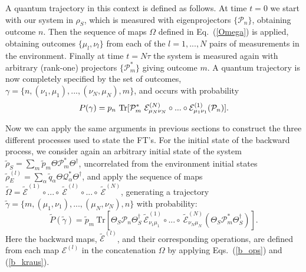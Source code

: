 \documentclass[aps,prx,twocolumn,showpacs,floatfix,superscriptaddress,graphics,longbibliography]{revtex4-1}
\newcommand{\tr}{\mathrm{Tr}}
\newcommand{\E}{{\mathcal E}}
\newcommand{\HAT}{}
\begin{document}
A quantum trajectory in this context is defined as follows. At time $t=0$ we start with our system in $\rho_S$, which is measured with eigenprojectors $\{ \HAT{\mathcal{P}}_n\}$, 
obtaining outcome $n$. Then the sequence of maps $\HAT{\Omega}$ defined in Eq.~(\ref{Omega}) is applied, obtaining outcomes $\{ \mu_l, \nu_l \}$ from each of the $l = 1, ..., N$ 
pairs of measurements in the environment. Finally at time $t = N \tau$ the system is measured again with arbitrary (rank-one) projectors $\{ \HAT{\mathcal{P}}_m^\ast \}$ giving outcome $m$. 
A quantum trajectory is now completely specified by the set of outcomes, $\gamma = \{n , (\nu_1, \mu_1), ..., (\nu_N, \mu_N), m \}$, and 
occurs with probability
\begin{equation}\label{fp_c}
P (\gamma) = p_n ~{\rm Tr}[\HAT{\mathcal{P}}_m^\ast~ \E^{(N)}_{\mu_N \nu_N} \circ ... \circ \E^{(1)}_{\mu_1 \nu_1} (\HAT{\mathcal{P}}_n)].
\end{equation}

Now we can apply the same arguments in previous sections to construct the three different processes used to state the FT's. 
For the initial state of the backward process, we consider again an arbitrary initial state of the system $\tilde{\rho}_S = \sum_m \tilde{p}_m \HAT\Theta \HAT{\mathcal{P}}_m^\ast \HAT\Theta^\dagger$, uncorrelated from the environment initial states $\tilde{\rho}_E^{(l)} = \sum_\alpha \tilde{q}_\alpha \HAT\Theta \HAT{\mathcal{Q}}_\alpha^\ast \HAT\Theta^\dagger$, 
and apply the sequence of maps $\tilde{\Omega} = \tilde{\E}^{(1)} \circ ... \circ~\tilde{\E}^{(l)} \circ ...\circ ~\tilde{\E}^{(N)}$, generating a trajectory $\tilde{\gamma} = \{m , (\mu_1, \nu_1), ..., (\mu_N, \nu_N), n \}$ with probability:
\begin{equation}
\tilde{P} (\tilde{\gamma}) = \tilde{p}_m ~\tr[\HAT\Theta_S \HAT{\mathcal{P}}_n \HAT\Theta_S^\dagger ~\tilde{\E}^{(1)}_{\nu_1 \mu_1} \circ ... \circ ~\tilde{\E}^{(N)}_{\nu_N \mu_N} (\HAT\Theta_S \HAT{\mathcal{P}}_m^\ast \HAT\Theta_S^\dagger)]. 
\end{equation}
Here the backward maps, $\tilde{\E}^{(l)}$, and their corresponding operations, are defined from each map $\E^{(l)}$ in the concatenation $\HAT{\Omega}$ by applying Eqs.~(\ref{b_ops}) and (\ref{b_kraus}). 
\end{document}
